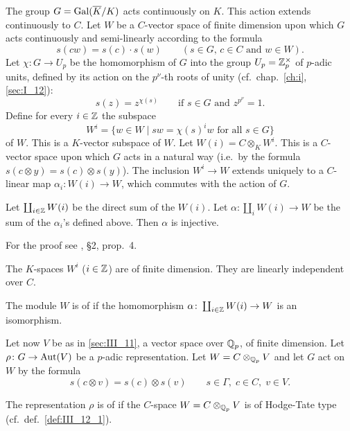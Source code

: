 The group $G = \operatorname{Gal}(\overline{K}/K)$ acts continuously on $K$. This action extends
continuously to $C$. Let $W$ be a $C$-vector space of finite dimension upon
which $G$ acts continuously and semi-linearly according to the formula
\[
	s(cw) = s(c) \cdot s(w) \qquad
	(s \in G, \, c \in C \text{ and } w \in W).
\]
Let $\chi\colon G \to U_p$ be the homomorphism of $G$ into the group $U_p =
\mathbb{Z}_p^\times$ of $p$-adic units, defined by its action on the $p^\nu$-th roots
of unity (cf.\ chap.~\ref{ch:i}, \ref{sec:I_12}):
\dpage
\[
	s(z) = z^{\chi(s)} \qquad \text{if } s \in G \text{ and } z^{p^\nu} = 1.
\]
Define for every $i \in \mathbb{Z}$ the subspace
\[
	W^i = \{ w \in W \mid sw = \chi(s)^i w \text{ for all } s\in G \}
\]
of $W$. This is a $K$-vector subspace of $W$. Let $W(i) = C \otimes_K W^i$.
This is a $C$-vector space upon which $G$ acts in a natural way (i.e.\ by the
formula $s(c \otimes y) = s(c) \otimes s(y)$). The inclusion $W^i \to W$
extends uniquely to a $C$-linear map $\alpha_i\colon W(i) \to W$, which
commutes with the action of $G$.

\begin{prop}[Tate]
	Let $\coprod_{i\in \mathbb{Z}} W(i)$ be the direct sum of the $W(i)$. Let
	$\alpha\colon \coprod_i W(i) \to W$ be the sum of the $\alpha_i$'s
	defined above. Then $\alpha$ is injective.
\end{prop}
For the proof see \cite{27}, \S 2, prop.~4.
\begin{corp}
	The $K$-spaces $W^i$ ($i \in \mathbb{Z}$) are of finite dimension.
	They are linearly independent over $C$.
\end{corp}

\begin{mydef}\label{def:III_12_1}
	The module $W$ is of %
	if the homomorphism $\alpha\colon \coprod_{i\in\mathbb{Z}} W(i) \to W$ is an
	isomorphism.
\end{mydef}

Let now $V$ be as in \ref{sec:III_11}, a vector space over $\mathbb{Q}_p$, of finite
dimension. Let $\rho\colon G \to \operatorname{Aut}(V)$ be a $p$-adic representation. Let $W
= C \otimes_{\mathbb{Q}_p} V$ and let $G$ act on $W$ by the formula
\dpage
\[
	s(c\otimes v) = s(c) \otimes s(v) \qquad
	s\in \Gamma, \; c\in C, \; v\in V.
\]
\begin{mydef}
	The representation $\rho$ is of %
	 if the $C$-space $W = C \otimes_{\mathbb{Q}_p} V$ is of
	Hodge-Tate type (cf.\ def.~\ref{def:III_12_1}).
\end{mydef}


